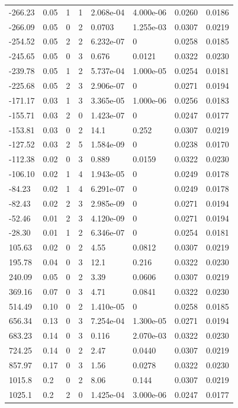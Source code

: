 \documentclass[preview]{standalone}
\begin{document}
{{\begin{tabular}{L{1.2cm}C{1.2cm} C{0.3cm}C{0.5cm} C{1.4cm}C{1.4cm} C{1.4cm}C{1.4cm}}
  -266.23  &  0.05  & 1     &  1 &  2.068e-04  & 4.000e-06  & 0.0260 &  0.0186   \\ 
  -266.09  &  0.05  & 0     &  2 &  0.0703  & 1.255e-03  & 0.0307 &  0.0219   \\ 
  -254.52  &  0.05  & 2     &  2 &  6.232e-07  & 0  & 0.0258 &  0.0185   \\ 
  -245.65  &  0.05  & 0     &  3 &  0.676  & 0.0121  & 0.0322 &  0.0230   \\ 
  -239.78  &  0.05  & 1     &  2 &  5.737e-04  & 1.000e-05  & 0.0254 &  0.0181   \\ 
  -225.68  &  0.05  & 2     &  3 &  2.906e-07  & 0  & 0.0271 &  0.0194   \\ 
  -171.17  &  0.03  & 1     &  3 &  3.365e-05  & 1.000e-06  & 0.0256 &  0.0183   \\ 
  -155.71  &  0.03  & 2     &  0 &  1.423e-07  & 0  & 0.0247 &  0.0177   \\ 
  -153.81  &  0.03  & 0     &  2 &  14.1  & 0.252  & 0.0307 &  0.0219   \\ 
  -127.52  &  0.03  & 2     &  5 &  1.584e-09  & 0  & 0.0238 &  0.0170   \\ 
  -112.38  &  0.02  & 0     &  3 &  0.889  & 0.0159  & 0.0322 &  0.0230   \\ 
  -106.10  &  0.02  & 1     &  4 &  1.943e-05  & 0  & 0.0249 &  0.0178   \\ 
  -84.23  &  0.02  & 1     &  4 &  6.291e-07  & 0  & 0.0249 &  0.0178   \\ 
  -82.43  &  0.02  & 2     &  3 &  2.985e-09  & 0  & 0.0271 &  0.0194   \\ 
  -52.46  &  0.01  & 2     &  3 &  4.120e-09  & 0  & 0.0271 &  0.0194   \\ 
  -28.30  &  0.01  & 1     &  2 &  6.346e-07  & 0  & 0.0254 &  0.0181   \\ 
  105.63  &  0.02  & 0     &  2 &  4.55  & 0.0812  & 0.0307 &  0.0219   \\ 
  195.78  &  0.04  & 0     &  3 &  12.1  & 0.216  & 0.0322 &  0.0230   \\ 
  240.09  &  0.05  & 0     &  2 &  3.39  & 0.0606  & 0.0307 &  0.0219   \\ 
  369.16  &  0.07  & 0     &  3 &  4.71  & 0.0841  & 0.0322 &  0.0230   \\ 
  514.49  &  0.10  & 0     &  2 &  1.410e-05  & 0  & 0.0258 &  0.0185   \\ 
  656.34  &  0.13  & 0     &  3 &  7.254e-04  & 1.300e-05  & 0.0271 &  0.0194   \\ 
  683.23  &  0.14  & 0     &  3 &  0.116  & 2.070e-03  & 0.0322 &  0.0230   \\ 
  724.25  &  0.14  & 0     &  2 &  2.47  & 0.0440  & 0.0307 &  0.0219   \\ 
  857.97  &  0.17  & 0     &  3 &  1.56  & 0.0278  & 0.0322 &  0.0230   \\ 
  1015.8  &   0.2  & 0     &  2 &  8.06  & 0.144  & 0.0307 &  0.0219   \\ 
  1025.1  &   0.2  & 2     &  0 &  1.425e-04  & 3.000e-06  & 0.0247 &  0.0177   \\ 
\hline 
\end{tabular} 

}}
\end{document}
